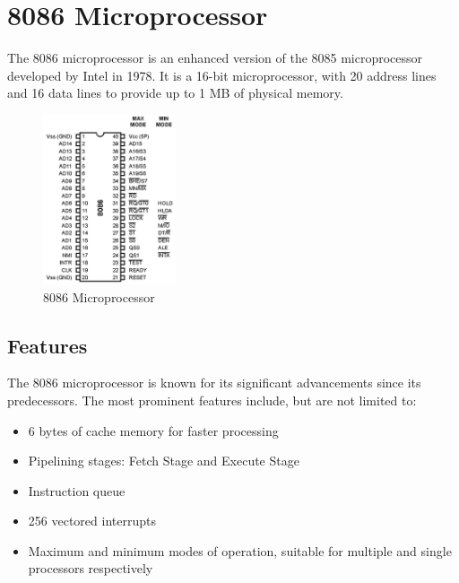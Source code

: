 \newpage
\section{8086 Microprocessor}
The 8086 microprocessor is an enhanced version of the 8085 microprocessor developed by Intel in 1978. It is a 16-bit microprocessor, with 20 address lines and 16 data lines to provide up to 1 MB of physical memory. 

    \begin{figure}[h]
        \begin{center}
            \includegraphics[width=0.35\textwidth]{figures/01_8086.png}
            \caption{8086 Microprocessor} \label{fig:8086}
        \end{center}
    \end{figure}

    \subsection{Features}
    The 8086 microprocessor is known for its significant advancements since its predecessors. The most prominent features include, but are not limited to:

        \begin{itemize}

            \item 6 bytes of cache memory for faster processing

            \item Pipelining stages: Fetch Stage and Execute Stage

            \item Instruction queue

            \item 256 vectored interrupts

            \item Maximum and minimum modes of operation, suitable for multiple and single processors respectively

        \end{itemize}

